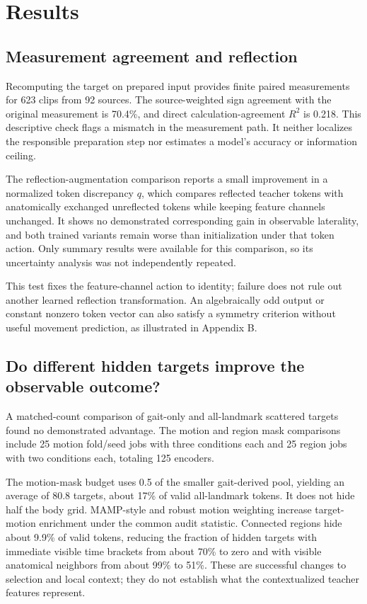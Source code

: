 \documentclass{article}
\begin{document}
\section{Results}\label{results}

\subsection{Measurement agreement and reflection}\label{measurement-agreement-and-reflection}

Recomputing the target on prepared input provides finite paired measurements for 623 clips from 92 sources. The source-weighted sign agreement with the original measurement is 70.4\%, and direct calculation-agreement \(R^2\) is 0.218. This descriptive check flags a mismatch in the measurement path. It neither localizes the responsible preparation step nor estimates a model's accuracy or information ceiling.

The reflection-augmentation comparison reports a small improvement in a normalized token discrepancy \(q\), which compares reflected teacher tokens with anatomically exchanged unreflected tokens while keeping feature channels unchanged. It shows no demonstrated corresponding gain in observable laterality, and both trained variants remain worse than initialization under that token action. Only summary results were available for this comparison, so its uncertainty analysis was not independently repeated.

This test fixes the feature-channel action to identity; failure does not rule out another learned reflection transformation. An algebraically odd output or constant nonzero token vector can also satisfy a symmetry criterion without useful movement prediction, as illustrated in Appendix B.

\subsection{Do different hidden targets improve the observable outcome?}\label{do-different-hidden-targets-improve-the-observable-outcome}

A matched-count comparison of gait-only and all-landmark scattered targets found no demonstrated advantage. The motion and region mask comparisons include 25 motion fold/seed jobs with three conditions each and 25 region jobs with two conditions each, totaling 125 encoders.

The motion-mask budget uses 0.5 of the smaller gait-derived pool, yielding an average of 80.8 targets, about 17\% of valid all-landmark tokens. It does not hide half the body grid. MAMP-style and robust motion weighting increase target-motion enrichment under the common audit statistic. Connected regions hide about 9.9\% of valid tokens, reducing the fraction of hidden targets with immediate visible time brackets from about 70\% to zero and with visible anatomical neighbors from about 99\% to 51\%. These are successful changes to selection and local context; they do not establish what the contextualized teacher features represent.
\end{document}
